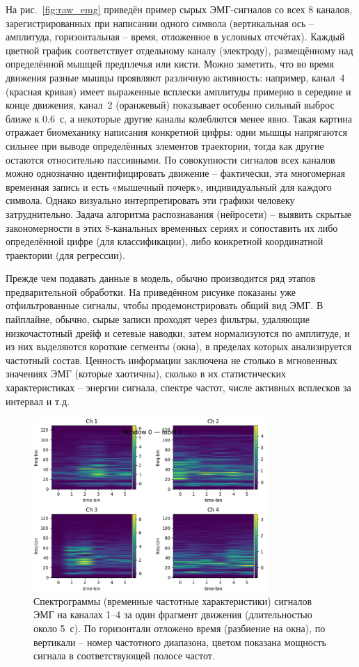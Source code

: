\documentclass[12pt,a4paper]{article}
\begin{document}
На рис.~\ref{fig:raw_emg} приведён пример сырых ЭМГ-сигналов со всех 8 каналов, зарегистрированных при написании одного символа (вертикальная ось – амплитуда, горизонтальная – время, отложенное в условных отсчётах). Каждый цветной график соответствует отдельному каналу (электроду), размещённому над определённой мышцей предплечья или кисти. Можно заметить, что во время движения разные мышцы проявляют различную активность: например, канал~4 (красная кривая) имеет выраженные всплески амплитуды примерно в середине и конце движения, канал~2 (оранжевый) показывает особенно сильный выброс ближе к 0.6~с, а некоторые другие каналы колеблются менее явно. Такая картина отражает биомеханику написания конкретной цифры: одни мышцы напрягаются сильнее при выводе определённых элементов траектории, тогда как другие остаются относительно пассивными. По совокупности сигналов всех каналов можно однозначно идентифицировать движение – фактически, эта многомерная временная запись и есть «мышечный почерк», индивидуальный для каждого символа. Однако визуально интерпретировать эти графики человеку затруднительно. Задача алгоритма распознавания (нейросети) – выявить скрытые закономерности в этих 8-канальных временных сериях и сопоставить их либо определённой цифре (для классификации), либо конкретной координатной траектории (для регрессии). 

Прежде чем подавать данные в модель, обычно производится ряд этапов предварительной обработки. На приведённом рисунке показаны уже отфильтрованные сигналы, чтобы продемонстрировать общий вид ЭМГ. В пайплайне, обычно, сырые записи проходят через фильтры, удаляющие низкочастотный дрейф и сетевые наводки, затем нормализуются по амплитуде, и из них выделяются короткие сегменты (окна), в пределах которых анализируется частотный состав. Ценность информации заключена не столько в мгновенных значениях ЭМГ (которые хаотичны), сколько в их статистических характеристиках – энергии сигнала, спектре частот, числе активных всплесков за интервал и т.д.

\begin{figure}[h]
\centering
\includegraphics[width=0.8\textwidth]{img3.png}
\caption{Спектрограммы (временные частотные характеристики) сигналов ЭМГ на каналах 1--4 за один фрагмент движения (длительностью около 5~с). По горизонтали отложено время (разбиение на окна), по вертикали – номер частотного диапазона, цветом показана мощность сигнала в соответствующей полосе частот.}
\label{fig:spectrogram1}
\end{figure}
\end{document}
